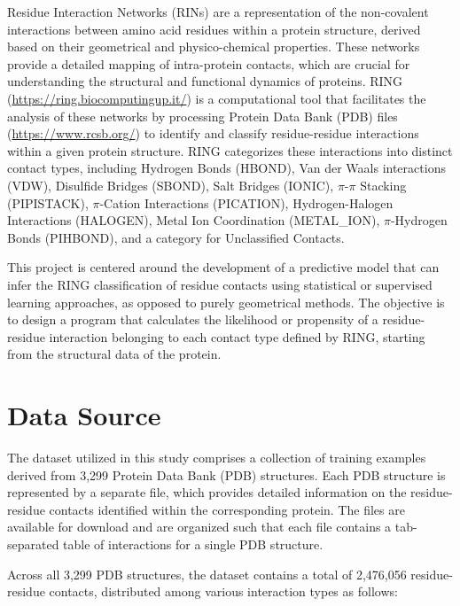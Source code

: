 \documentclass[10pt,twocolumn,letterpaper]{article}
\begin{document}
Residue Interaction Networks (RINs) are a representation of the non-covalent interactions between amino acid residues within a protein structure, derived based on their geometrical and physico-chemical properties. These networks provide a detailed mapping of intra-protein contacts, which are crucial for understanding the structural and functional dynamics of proteins. 
RING (\url{https://ring.biocomputingup.it/}) is a computational tool that facilitates the analysis of these networks by processing Protein Data Bank (PDB) files (\url{https://www.rcsb.org/}) to identify and classify residue-residue interactions within a given protein structure. 
RING categorizes these interactions into distinct contact types, including Hydrogen Bonds (HBOND), Van der Waals interactions (VDW), Disulfide Bridges (SBOND), Salt Bridges (IONIC), $\pi$-$\pi$ Stacking (PIPISTACK), $\pi$-Cation Interactions (PICATION), Hydrogen-Halogen Interactions (HALOGEN), Metal Ion Coordination (METAL\_ION), $\pi$-Hydrogen Bonds (PIHBOND), and a category for Unclassified Contacts.

This project is centered around the development of a predictive model that can infer the RING classification of residue contacts using statistical or supervised learning approaches, as opposed to purely geometrical methods. The objective is to design a program that calculates the likelihood or propensity of a residue-residue interaction belonging to each contact type defined by RING, starting from the structural data of the protein.


\section{Data Source}
\label{sec:datasource}

The dataset utilized in this study comprises a collection of training examples derived from 3,299 Protein Data Bank (PDB) structures. Each PDB structure is represented by a separate file, which provides detailed information on the residue-residue contacts identified within the corresponding protein. The files are available for download and are organized such that each file contains a tab-separated table of interactions for a single PDB structure. 

Across all 3,299 PDB structures, the dataset contains a total of 2,476,056 residue-residue contacts, distributed among various interaction types as follows:
\end{document}
